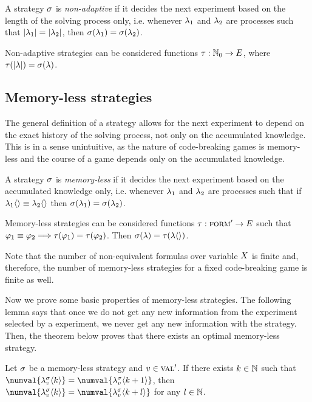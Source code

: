\begin{definition}
A strategy $\sigma$ is \emph{non-adaptive} if it decides the next experiment
  based on the length of the solving process only, i.e.
  whenever $\lambda_1$ and $\lambda_2$ are processes such that
  $|\lambda_1| = |\lambda_2|$,
  then
  $\sigma(\lambda_1) = \sigma(\lambda_2)$.

Non-adaptive strategies can be considered functions $\tau: \mathbb{N}_0 -> E$,
where $\tau(|\lambda|) = \sigma(\lambda)$.
\end{definition}

\subsection{Memory-less strategies}

The general definition of a strategy allows for the next experiment
  to depend on the exact history of the solving process,
  not only on the accumulated knowledge.
This is in a sense unintuitive, as
  the nature of code-breaking games is memory-less
  and the course of a game depends only on the accumulated knowledge.

\begin{definition}
A strategy $\sigma$ is \emph{memory-less} if it decides the next experiment
  based on the accumulated knowledge only, i.e.
  whenever $\lambda_1$ and $\lambda_2$ are processes such that if
  $\lambda_1\langle\rangle \equiv \lambda_2\langle\rangle$
  then
  $\sigma(\lambda_1) = \sigma(\lambda_2)$.

Memory-less strategies can be considered functions
  $\tau: {\textsc{form}'} -> E$ such that
  $\varphi_1\equiv\varphi_2 ==> \tau(\varphi_1)=\tau(\varphi_2)$.
Then $\sigma(\lambda) = \tau(\lambda\langle\rangle)$.
\end{definition}

Note that the number of non-equivalent formulas over variable $X$
  is finite and, therefore, the number of memory-less strategies for a fixed
  code-breaking game
  is finite as well.

Now we prove some basic properties of memory-less strategies.
The following lemma says that once we do not get any new information
  from the experiment selected by a experiment,
  we never get any new information with the strategy.
Then, the theorem below proves that there exists an optimal
  memory-less strategy.

\begin{lemma}
Let $\sigma$ be a memory-less strategy and $v\in\textsc{val}'$.
If there exists $k\in\mathbb{N}$ such that
  $\numval{\stgknow{\stg}{\val}{k}} = \numval{\stgknow{\stg}{\val}{k+1}}$,
 then
  $\numval{\stgknow{\stg}{\val}{k}} = \numval{\stgknow{\stg}{\val}{k+l}}$
 for any $l\in\mathbb{N}$.
\end{lemma}


